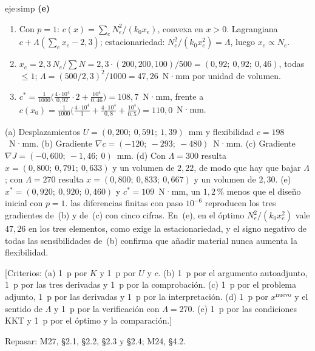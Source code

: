 \begin{solucion}{eje:simp}
\noindent\textbf{(e)}
\begin{enumerate}[label=\arabic*.]
  \item Con $p=1$: $c(x)=\sum_eN_e^{2}/(k_0x_e)$, convexa en $x>0$. Lagrangiana $c+\Lambda(\sum_ex_e-2{,}3)$; estacionariedad: $N_e^{2}/(k_0x_e^{2})=\Lambda$, luego $x_e\propto N_e$.
  \item $x_e=2{,}3\,N_e/\sum N=2{,}3\cdot(200,200,100)/500=(0{,}92;\ 0{,}92;\ 0{,}46)$, todas $\le 1$; $\Lambda=(500/2{,}3)^{2}/1000=47{,}26$~N·mm por unidad de volumen.
  \item $c^{\ast}=\frac{1}{1000}\bigl(\frac{4\cdot 10^{4}}{0{,}92}\cdot 2+\frac{10^{4}}{0{,}46}\bigr)=108{,}7$~N·mm, frente a $c(x_0)=\frac{1}{1000}\bigl(\frac{4\cdot 10^{4}}{1}+\frac{4\cdot 10^{4}}{0{,}8}+\frac{10^{4}}{0{,}5}\bigr)=110{,}0$~N·mm.
\end{enumerate}
\resultado (a) Desplazamientos $U=(0{,}200;\ 0{,}591;\ 1{,}39)$~mm y flexibilidad $c=198$~N·mm. (b) Gradiente $\nabla c=(-120;\ -293;\ -480)$~N·mm. (c) Gradiente $\nabla J=(-0{,}600;\ -1{,}46;\ 0)$~mm. (d) Con $\Lambda=300$ resulta $x=(0{,}800;\ 0{,}791;\ 0{,}633)$ y un volumen de $2{,}22$, de modo que hay que bajar $\Lambda$; con $\Lambda=270$ resulta $x=(0{,}800;\ 0{,}833;\ 0{,}667)$ y un volumen de $2{,}30$. (e) $x^{\ast}=(0{,}920;\ 0{,}920;\ 0{,}460)$ y $c^{\ast}=109$~N·mm, un $1{,}2\,\%$ menos que el diseño inicial con $p=1$.
\comprobacion las diferencias finitas con paso $10^{-6}$ reproducen los tres gradientes de~(b) y de~(c) con cinco cifras. En~(e), en el óptimo $N_e^{2}/(k_0x_e^{2})$ vale $47{,}26$ en los tres elementos, como exige la estacionariedad, y el signo negativo de todas las sensibilidades de~(b) confirma que añadir material nunca aumenta la flexibilidad.

[Criterios: (a) 1~p por $K$ y 1~p por $U$ y $c$. (b) 1~p por el argumento autoadjunto, 1~p por las tres derivadas y 1~p por la comprobación. (c) 1~p por el problema adjunto, 1~p por las derivadas y 1~p por la interpretación. (d) 1~p por $x^{\text{nuevo}}$ y el sentido de $\Lambda$ y 1~p por la verificación con $\Lambda=270$. (e) 1~p por las condiciones KKT y 1~p por el óptimo y la comparación.]

Repasar: M27, §2.1, §2.2, §2.3 y §2.4; M24, §4.2.
\end{solucion}

